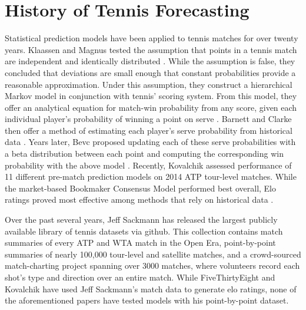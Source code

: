 \documentclass[chapterprefix=false]{report}
\begin{document}



\section{History of Tennis Forecasting}

Statistical prediction models have been applied to tennis matches for over twenty years. Klaassen and Magnus tested the assumption that points in a tennis match are independent and identically distributed \cite{KlaassenandMagnus2001}. While the assumption is false, they concluded that deviations are small enough that constant probabilities provide a reasonable approximation. Under this assumption, they construct a hierarchical Markov model in conjunction with tennis' scoring system. From this model, they offer an analytical equation for match-win probability from any score, given each individual player's probability of winning a point on serve \cite{Klaassen2003}.  Barnett and Clarke then offer a method of estimating each player's serve probability from historical data \cite{BarnettandClarke2005}. Years later, Bevc proposed updating each of these serve probabilities with a beta distribution between each point and computing the corresponding win probability with the above model \cite{Bevc2015}. Recently, Kovalchik assessed performance of 11 different pre-match prediction models on 2014 ATP tour-level matches. While the market-based Bookmaker Consensus Model performed best overall, Elo ratings proved most effective among methods that rely on historical data \cite{Kovalchik2016}.

Over the past several years, Jeff Sackmann has released the largest publicly available library of tennis datasets via github. This collection contains match summaries of every ATP and WTA match in the Open Era, point-by-point summaries of nearly 100,000 tour-level and satellite matches, and a crowd-sourced match-charting project spanning over 3000 matches, where volunteers record each shot’s type and direction over an entire match. While FiveThirtyEight and Kovalchik have used Jeff Sackmann’s match data to generate elo ratings, none of the aforementioned papers have tested models with his point-by-point dataset.
\end{document}
